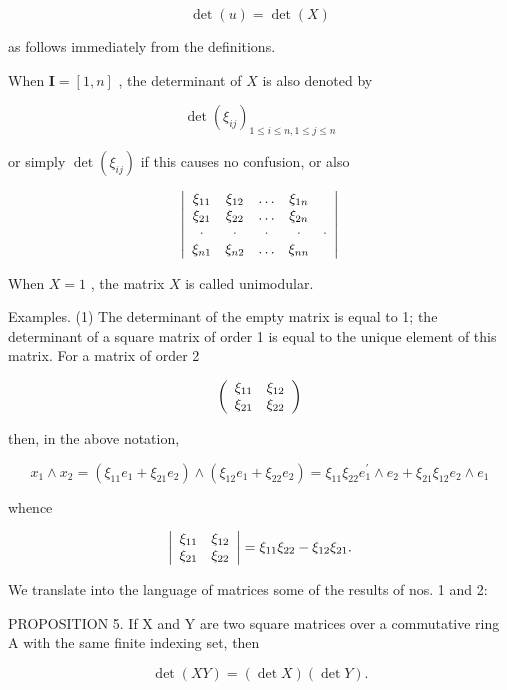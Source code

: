 \[
\det (u) = \det (X)\tag{7}
\]

as follows immediately from the definitions.

When \(\mathbf{I} = [1, n]\) , the determinant of \(X\) is also denoted by

\[
\det (\xi_ {i j}) _ {1 \leqslant i \leqslant n, 1 \leqslant j \leqslant n}
\]

or simply \(\operatorname{det}(\xi_{ij})\) if this causes no confusion, or also

\[
\left| \begin{array}{c c c c c} \xi_ {1 1} & \xi_ {1 2} & \ldots & \xi_ {1 n} \\ \xi_ {2 1} & \xi_ {2 2} & \ldots & \xi_ {2 n} \\ \cdot & \cdot & \cdot & \cdot & \cdot \\ \xi_ {n 1} & \xi_ {n 2} & \ldots & \xi_ {n n} \end{array} \right|
\]

When \(X = 1\) , the matrix \(X\) is called unimodular.

Examples. (1) The determinant of the empty matrix is equal to 1; the determinant of a square matrix of order 1 is equal to the unique element of this matrix. For a matrix of order 2

\[
\left( \begin{array}{c c} \xi_ {1 1} & \xi_ {1 2} \\ \xi_ {2 1} & \xi_ {2 2} \end{array} \right)
\]

then, in the above notation,

\[
x _ {1} \wedge x _ {2} = (\xi_ {1 1} e _ {1} + \xi_ {2 1} e _ {2}) \wedge (\xi_ {1 2} e _ {1} + \xi_ {2 2} e _ {2}) = \xi_ {1 1} \xi_ {2 2} e _ {1} ^ {\prime} \wedge e _ {2} + \xi_ {2 1} \xi_ {1 2} e _ {2} \wedge e _ {1}
\]

whence

\[
\left| \begin{array}{c c} \xi_ {1 1} & \xi_ {1 2} \\ \xi_ {2 1} & \xi_ {2 2} \end{array} \right| = \xi_ {1 1} \xi_ {2 2} - \xi_ {1 2} \xi_ {2 1}.
\]

We translate into the language of matrices some of the results of nos. 1 and 2:

PROPOSITION 5. If X and Y are two square matrices over a commutative ring A with the same finite indexing set, then

\[
\det (X Y) = (\det X) (\det Y).\tag{8}
\]

